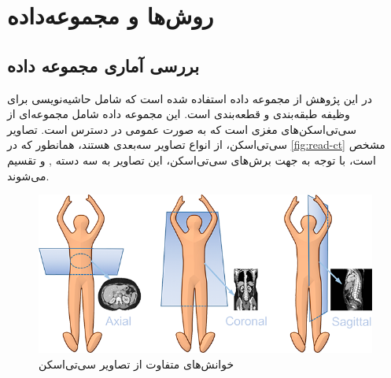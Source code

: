 \chapter{روش‌ها و مجموعه‌داده}
\section{بررسی آماری مجموعه داده}

در این پژوهش از مجموعه داده
\cite{physionet_hssayeni2020intracranial,hssayeni2020computed}
استفاده شده است که شامل حاشیه‌نویسی برای وظیفه طبقه‌بندی و قطعه‌بندی است. این مجموعه داده  شامل مجموعه‌ای از سی‌تی‌اسکن‌های مغزی است که به صورت عمومی در دسترس است.
تصاویر سی‌تی‌اسکن، از انواع تصاویر سه‌بعدی هستند، همانطور که در 
\autoref{fig:read-ct}
مشخص است،
 با توجه به جهت برش‌های سی‌تی‌اسکن، این تصاویر به سه دسته 
 ,  و 
 تقسیم می‌شوند.
\begin{figure}[H]
\centering
\includegraphics[width=1.0\linewidth]{"Images/Chapter2/read CT"}
\caption{خوانش‌های متفاوت از تصاویر سی‌تی‌اسکن
\cite{kaggleCTScansDICOM}}
\label{fig:read-ct}
\end{figure}
 
